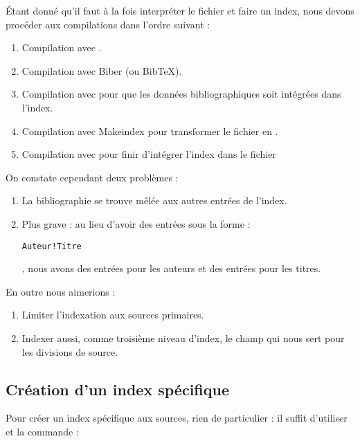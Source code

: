 \begin{latexcode}
\usepackage[indexing=cite]{biblatex}
\end{latexcode}

Étant donné qu'il faut à la fois interpréter le fichier  et faire un index, nous devons procéder aux compilations dans l'ordre suivant :

\begin{enumerate}
\item Compilation avec \XeLaTeX.
\item Compilation avec Biber (ou BibTeX).
\item Compilation avec \XeLaTeX pour que les données bibliographiques soit intégrées dans l'index.
\item Compilation avec Makeindex pour transformer le fichier  en .
\item Compilation avec \XeLaTeX pour finir d'intégrer l'index dans le fichier 
\end{enumerate}

On constate cependant deux problèmes : 
\begin{enumerate}
\item La bibliographie se trouve mêlée aux autres entrées de l'index.
\item Plus grave : au lieu d'avoir des entrées sous la forme : \begin{english}\verb|Auteur!Titre|\end{english}, nous avons des entrées pour les auteurs et des entrées pour les titres.
\end{enumerate}

En outre nous aimerions :
\begin{enumerate}
\item Limiter l'indexation aux sources primaires.
\item Indexer aussi, comme troisième niveau d'index, le champ  qui nous sert pour les divisions de source. 
\end{enumerate}

\subsection{Création d'un index spécifique}

Pour créer un index spécifique aux sources, rien de particulier : il suffit d'utiliser  et la commande  :

\begin{latexcode}
\end{latexcode}

